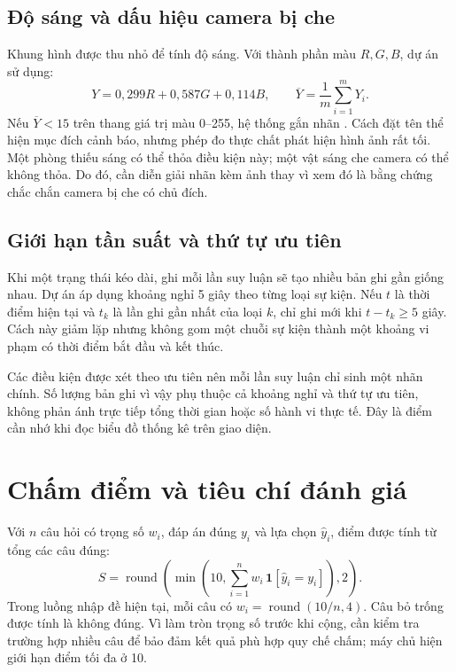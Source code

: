 \subsection{Độ sáng và dấu hiệu camera bị che}
Khung hình được thu nhỏ để tính độ sáng. Với thành phần màu $R,G,B$, dự án sử dụng:
\begin{equation}
 Y=0{,}299R+0{,}587G+0{,}114B,\qquad
 \overline{Y}=\frac{1}{m}\sum_{i=1}^{m}Y_i.
\end{equation}
Nếu $\overline{Y}<15$ trên thang giá trị màu 0--255, hệ thống gắn nhãn . Cách đặt tên thể hiện mục đích cảnh báo, nhưng phép đo thực chất phát hiện hình ảnh rất tối. Một phòng thiếu sáng có thể thỏa điều kiện này; một vật sáng che camera có thể không thỏa. Do đó, cần diễn giải nhãn kèm ảnh thay vì xem đó là bằng chứng chắc chắn camera bị che có chủ đích.

\subsection{Giới hạn tần suất và thứ tự ưu tiên}
Khi một trạng thái kéo dài, ghi mỗi lần suy luận sẽ tạo nhiều bản ghi gần giống nhau. Dự án áp dụng khoảng nghỉ 5 giây theo từng loại sự kiện. Nếu $t$ là thời điểm hiện tại và $t_k$ là lần ghi gần nhất của loại $k$, chỉ ghi mới khi $t-t_k\geq5$ giây. Cách này giảm lặp nhưng không gom một chuỗi sự kiện thành một khoảng vi phạm có thời điểm bắt đầu và kết thúc.

Các điều kiện được xét theo ưu tiên nên mỗi lần suy luận chỉ sinh một nhãn chính. Số lượng bản ghi vì vậy phụ thuộc cả khoảng nghỉ và thứ tự ưu tiên, không phản ánh trực tiếp tổng thời gian hoặc số hành vi thực tế. Đây là điểm cần nhớ khi đọc biểu đồ thống kê trên giao diện.

\section{Chấm điểm và tiêu chí đánh giá}
Với $n$ câu hỏi có trọng số $w_i$, đáp án đúng $y_i$ và lựa chọn $\hat y_i$, điểm được tính từ tổng các câu đúng:
\begin{equation}
 S=\operatorname{round}\left(\min\left(10,\sum_{i=1}^{n}w_i\,\mathbf{1}[\hat y_i=y_i]\right),2\right).
\end{equation}
Trong luồng nhập đề hiện tại, mỗi câu có $w_i=\operatorname{round}(10/n,4)$. Câu bỏ trống được tính là không đúng. Vì làm tròn trọng số trước khi cộng, cần kiểm tra trường hợp nhiều câu để bảo đảm kết quả phù hợp quy chế chấm; máy chủ hiện giới hạn điểm tối đa ở 10.

